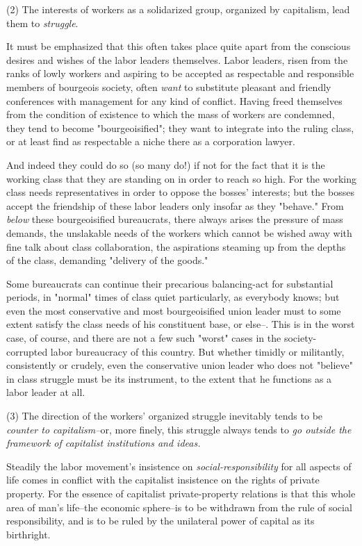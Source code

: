 (2) The interests of workers as a solidarized group, organized by capitalism, lead them to \emph{struggle}.

It must be emphasized that this often takes place quite apart from the conscious desires and wishes of the labor leaders themselves. Labor leaders, risen from the ranks of lowly workers and aspiring to be accepted as respectable and responsible members of bourgeois society, often \emph{want} to substitute pleasant and friendly conferences with management for any kind of conflict. Having freed themselves from the condition of existence to which the mass of workers are condemned, they tend to become "bourgeoisified"; they want to integrate into the ruling class, or at least find as respectable a niche there as a corporation lawyer.

And indeed they could do so (so many do!) if not for the fact that it is the working class that they are standing on in order to reach so high. For the working class needs representatives in order to oppose the bosses' interests; but the bosses accept the friendship of these labor leaders only insofar as they "behave." From \emph{below} these bourgeoisified bureaucrats, there always arises the pressure of mass demands, the unslakable needs of the workers which cannot be wished away with fine talk about class collaboration, the aspirations steaming up from the depths of the class, demanding "delivery of the goods."

Some bureaucrats can continue their precarious balancing-act for substantial periods, in "normal" times of class quiet particularly, as everybody knows; but even the most conservative and most bourgeoisified union leader must to some extent satisfy the class needs of his constituent base, or else--. This is in the worst case, of course, and there are not a few such "worst" cases in the society-corrupted labor bureaucracy of this country. But whether timidly or militantly, consistently or crudely, even the conservative union leader who does not "believe" in class struggle must be its instrument, to the extent that he functions as a labor leader at all.

(3) The direction of the workers' organized struggle inevitably tends to be \emph{counter to capitalism--}or, more finely, this struggle always tends to \emph{go outside the framework of capitalist institutions and ideas.}

Steadily the labor movement's insistence on \emph{social-responsibility} for all aspects of life comes in conflict with the capitalist insistence on the rights of private property. For the essence of capitalist private-property relations is that this whole area of man's life--the economic sphere--is to be withdrawn from the rule of social responsibility, and is to be ruled by the unilateral power of capital as its birthright.


